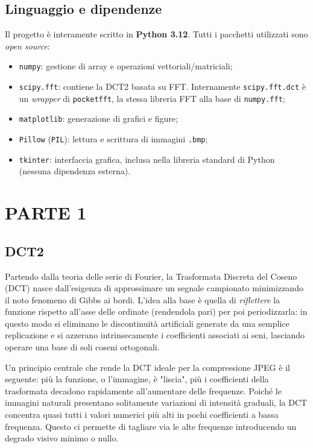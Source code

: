 \documentclass[11pt,a4paper]{article}
\makeatletter
\let\@origtexttt\texttt
\renewcommand{\texttt}[1]{{\def\_{\textunderscore\discretionary{}{}{}}\@origtexttt{#1}}}
\makeatother
\begin{document}
\subsection{Linguaggio e dipendenze}

Il progetto è interamente scritto in \textbf{Python 3.12}. Tutti i pacchetti
utilizzati sono \emph{open source}:
\begin{itemize}
  \item \texttt{numpy}: gestione di array e operazioni vettoriali/matriciali;
  \item \texttt{scipy.fft}: contiene la DCT2 basata su FFT. Internamente
        \texttt{scipy.fft.dct} è un \emph{wrapper} di \texttt{pocketfft}, la
        stessa libreria FFT alla base di \texttt{numpy.fft};
  \item \texttt{matplotlib}: generazione di grafici e figure;
  \item \texttt{Pillow} (\texttt{PIL}): lettura e scrittura di immagini
        \texttt{.bmp};
  \item \texttt{tkinter}: interfaccia grafica, inclusa nella libreria standard
        di Python (nessuna dipendenza esterna).
\end{itemize}

\section{PARTE 1}

\subsection{DCT2}

Partendo dalla teoria delle serie di Fourier, la Trasformata Discreta del Coseno (DCT) nasce dall'esigenza 
di approssimare un segnale campionato minimizzando il noto fenomeno di Gibbs ai bordi. 
L'idea alla base è quella di \emph{riflettere} la funzione rispetto all'asse delle ordinate 
(rendendola pari) per poi periodizzarla: in questo modo si eliminano le discontinuità artificiali 
generate da una semplice replicazione e si azzerano intrinsecamente i coefficienti associati ai seni, 
lasciando operare una base di soli coseni ortogonali.

Un principio centrale che rende la DCT ideale per la compressione JPEG è il seguente: più la funzione,
o l'immagine, è "liscia", più i coefficienti della trasformata decadono rapidamente all'aumentare delle frequenze. 
Poiché le immagini naturali presentano solitamente variazioni di intensità graduali, la DCT concentra quasi tutti i valori 
numerici più alti in pochi coefficienti a bassa frequenza. Questo ci permette di tagliare
via le alte frequenze introducendo un degrado visivo minimo o nullo.
\end{document}
